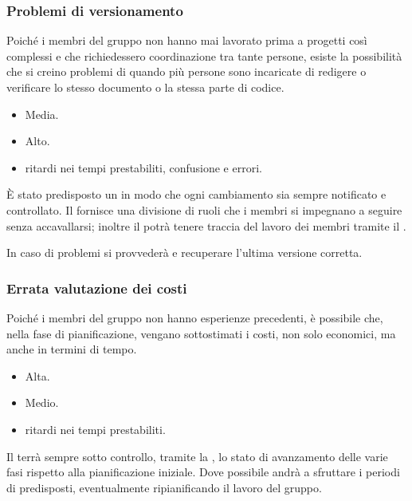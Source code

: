 \documentclass[a4paper, titlepage]{article}
\begin{document}
\subsubsection{Problemi di versionamento}
 Poiché i membri del gruppo non hanno mai lavorato prima a progetti così complessi e che richiedessero coordinazione tra tante persone, esiste la possibilità che si creino problemi di  quando più persone sono incaricate di redigere o verificare lo stesso documento o la stessa parte di codice.
 
	\begin{itemize}
		\item {} Media.
		\item {} Alto.
		\item {} ritardi nei tempi prestabiliti, confusione e errori.
	\end{itemize}
	
 È stato predisposto un  in modo che ogni cambiamento sia sempre notificato e controllato. Il  fornisce una divisione di ruoli che i membri si impegnano a seguire senza accavallarsi; inoltre il  potrà tenere traccia del lavoro dei membri tramite il  .
 
 In caso di problemi si provvederà e recuperare l'ultima versione corretta.


\subsubsection{Errata valutazione dei costi}
 Poiché i membri del gruppo non hanno esperienze precedenti, è possibile che, nella fase di pianificazione, vengano sottostimati i costi, non solo economici, ma anche in termini di tempo.
 
	\begin{itemize}
		\item {} Alta.
		\item {} Medio.
		\item {} ritardi nei tempi prestabiliti.
	\end{itemize}
	
 Il  terrà sempre sotto controllo, tramite la , lo stato di avanzamento delle varie fasi rispetto alla pianificazione iniziale. Dove possibile andrà a sfruttare i periodi di  predisposti, eventualmente ripianificando il lavoro del gruppo.
 
\end{document}
